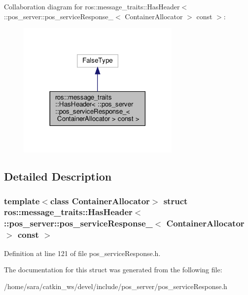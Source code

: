 Collaboration diagram for ros\+:\+:message\+\_\+traits\+:\+:Has\+Header$<$ \+:\+:pos\+\_\+server\+:\+:pos\+\_\+service\+Response\+\_\+$<$ Container\+Allocator $>$ const $>$\+:
\nopagebreak
\begin{figure}[H]
\begin{center}
\leavevmode
\includegraphics[width=225pt]{structros_1_1message__traits_1_1HasHeader_3_01_1_1pos__server_1_1pos__serviceResponse___3_01Conta92aef1df5abaec1c5a05e90e2af178d}
\end{center}
\end{figure}


\subsection{Detailed Description}
\subsubsection*{template$<$class Container\+Allocator$>$\newline
struct ros\+::message\+\_\+traits\+::\+Has\+Header$<$ \+::pos\+\_\+server\+::pos\+\_\+service\+Response\+\_\+$<$ Container\+Allocator $>$ const $>$}



Definition at line 121 of file pos\+\_\+service\+Response.\+h.



The documentation for this struct was generated from the following file\+:\begin{DoxyCompactItemize}
\item 
/home/sara/catkin\+\_\+ws/devel/include/pos\+\_\+server/pos\+\_\+service\+Response.\+h\end{DoxyCompactItemize}
